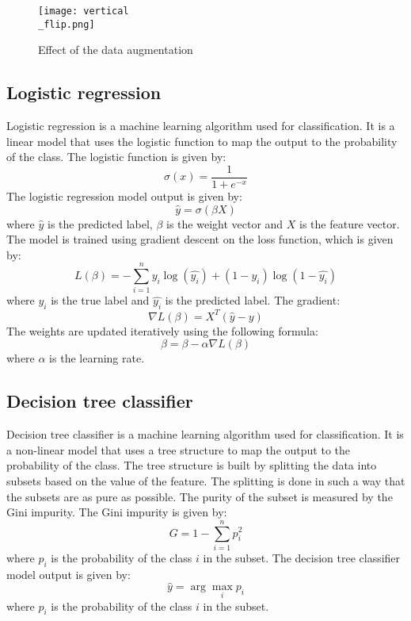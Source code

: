 \documentclass{article}
\begin{document}
\begin{figure}[h]
    \centering
    \texttt{[image: vertical\\\_flip.png]}
    \caption{Effect of the data augmentation}
    \label{fig:augmentation}
\end{figure}

\subsection{Logistic regression}
\label{subsec:logistic_regression}
Logistic regression is a machine learning algorithm used for classification. It is a linear model that uses the logistic function to map the output to the probability of the class. The logistic function is given by:
\begin{equation}
    \sigma(x) = \frac{1}{1 + e^{-x}}
\end{equation}
The logistic regression model output is given by:
\begin{equation}
    \hat{y} = \sigma(\beta X)
\end{equation}
where $\hat{y}$ is the predicted label, $\beta$ is the weight vector and $X$ is the feature vector. The model is trained using gradient descent on the loss function, which is given by:
\begin{equation}
    L(\beta) = -\sum_{i=1}^{n} y_i \log(\hat{y_i}) + (1 - y_i) \log(1 - \hat{y_i})
\end{equation}
where $y_i$ is the true label and $\hat{y_i}$ is the predicted label.
The gradient:
\begin{equation}
    \nabla L(\beta) = X^T(\hat{y} - y)
\end{equation}
The weights are updated iteratively using the following formula:
\begin{equation}
    \beta = \beta - \alpha \nabla L(\beta)
\end{equation}
where $\alpha$ is the learning rate.

\subsection{Decision tree classifier}
\label{subsec:decision_tree}
Decision tree classifier is a machine learning algorithm used for classification. It is a non-linear model that uses a tree structure to map the output to the probability of the class. The tree structure is built by splitting the data into subsets based on the value of the feature. The splitting is done in such a way that the subsets are as pure as possible. The purity of the subset is measured by the Gini impurity. The Gini impurity is given by:
\begin{equation}
    G = 1 - \sum_{i=1}^{n} p_i^2
\end{equation}
where $p_i$ is the probability of the class $i$ in the subset. The decision tree classifier model output is given by:
\begin{equation}
    \hat{y} = \arg\max_{i} p_i
\end{equation}
where $p_i$ is the probability of the class $i$ in the subset.
\end{document}
